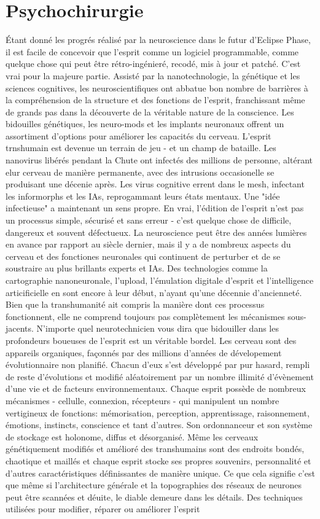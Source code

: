 \section{Psychochirurgie} Étant donné les progrés réalisé par la neuroscience dans le futur d'Eclipse Phase, il est facile de concevoir que l'esprit comme un logiciel programmable, comme quelque chose qui peut être rétro-ingénieré, recodé, mis à jour et patché. C'est vrai pour la majeure partie. Assisté par la nanotechnologie, la génétique et les sciences cognitives, les neuroscientifiques ont abbatue bon nombre de barrières à la compréhension de la structure et des fonctions de l'esprit, franchissant même de grands pas dans la découverte de la véritable nature de la conscience. Les bidouilles génétiques, les neuro-mods et les implants neuronaux offrent un assortiment d'options pour améliorer les capacités du cerveau. L'esprit trnshumain est devenue un terrain de jeu - et un champ de bataille. Les nanovirus libérés pendant la Chute ont infectés des millions de personne, altérant elur cerveau de manière permanente, avec des intrusions occasionelle se produisant une décenie après. Les virus cognitive errent dans le mesh, infectant les informorphs et les IAs, reprogammant leurs états mentaux. Une "idée infectieuse" a maintenant un sens propre. En vrai, l'édition de l'esprit n'est pas un processus simple, sécurisé et sans erreur - c'est quelque chose de difficile, dangereux et souvent défectueux. La neuroscience peut être des années lumières en avance par rapport au siècle dernier, mais il y a de nombreux aspects du cerveau et des fonctiones neuronales qui continuent de perturber et de se soustraire au plus brillants experts et IAs. Des technologies comme la cartographie nanoneuronale, l'upload, l'émulation digitale d'esprit et l'intelligence articificielle en sont encore à leur début, n'ayant qu'une décennie d'ancienneté. Bien que la transhumanité ait compris la manière dont ces processus fonctionnent, elle ne comprend toujours pas complètement les mécanismes sous-jacents. N'importe quel neurotechnicien vous dira que bidouiller dans les profondeurs boueuses de l'esprit est un véritable bordel. Les cerveau sont des appareils organiques, façonnés par des millions d'années de dévelopement évolutionnaire non planifié. Chacun d'eux s'est développé par pur hasard, rempli de reste d'évolutions et modifié aléatoirement par un nombre illimité d'évènement d'une vie et de facteurs environnementaux. Chaque esprit possède de nombreux mécanismes - cellulle, connexion, récepteurs - qui manipulent un nombre vertigineux de fonctions: mémorisation, perception, apprentissage, raisonnement, émotions, instincts, conscience et tant d'autres. Son ordonnanceur et son système de stockage est holonome, diffus et désorganisé. Même les cerveaux génétiquement modifiés et amélioré des transhumains sont des endroits bondés, chaotique et maillés et chaque esprit stocke ses propres souvenirs, personnalité et d'autres caractéristiques définissantes de manière unique. Ce que cela signifie c'est que même si l'architecture générale et la topographies des réseaux de neurones peut être scannées et déuite, le diable demeure dans les détails. Des techniques utilisées pour modifier, réparer ou améliorer l'esprit 